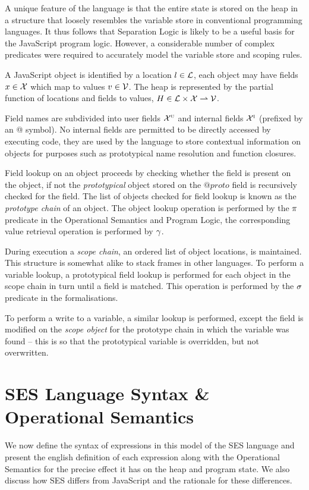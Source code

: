 \documentclass[a4paper,notitlepage]{report}
\begin{document}
  A unique feature of the
  language is that the entire state is stored on the heap in a structure that
  loosely resembles the variable store in conventional programming languages. It
  thus follows that Separation Logic is likely to be a useful basis for the
  JavaScript program logic. However, a considerable number of complex predicates
  were required to accurately model the variable store and scoping rules.


  A JavaScript object is identified by a location $l \in \mathcal{L}$, each object may
  have fields $x \in \mathcal{X}$ which map to values $v \in \mathcal{V}$. The heap is
  represented by the partial function of locations and fields to
  values, $H \in \mathcal{L} \times \mathcal{X} \rightharpoonup \mathcal{V}$.

  Field names are subdivided into user fields $\mathcal{X}^{\textsc{u}}$ and internal fields
  $\mathcal{X}^{\textsc{i}}$ (prefixed by an @ symbol). No internal fields are permitted to be
  directly accessed by executing code, they are used by the language to store
  contextual information on objects for purposes such as prototypical name
  resolution and function closures.

  Field lookup on an object proceeds by checking whether the field is present on
  the object, if not the \emph{prototypical} object stored on the $@proto$ field
  is recursively checked for the field. The list of
  objects checked for field lookup is known as the \emph{prototype chain}
  of an object. The object lookup operation is performed by the $\pi$
  predicate in the Operational Semantics and Program Logic, the corresponding
  value retrieval operation is performed by $\gamma$.

  During execution a \emph{scope chain}, an ordered list of object locations, is
  maintained. This structure is somewhat alike to stack frames in other languages.
  To perform a variable lookup, a prototypical field lookup is performed for
  each object in the scope chain in turn until a field is matched. This
  operation is performed by the $\sigma$ predicate in the formalisations.

  To perform a write to a variable, a similar lookup is performed, except the
  field is modified on the \emph{scope object} for the prototype chain in which the
  variable was found -- this is so that the prototypical variable is overridden,
  but not overwritten.


\chapter{SES Language Syntax \& Operational Semantics}
  We now define the syntax of expressions in this model of the SES
  language and present the english definition of each expression along with the
  Operational Semantics for the precise effect it has on the heap and program
  state. We also discuss how SES differs from JavaScript and the rationale for
  these differences.
\end{document}
